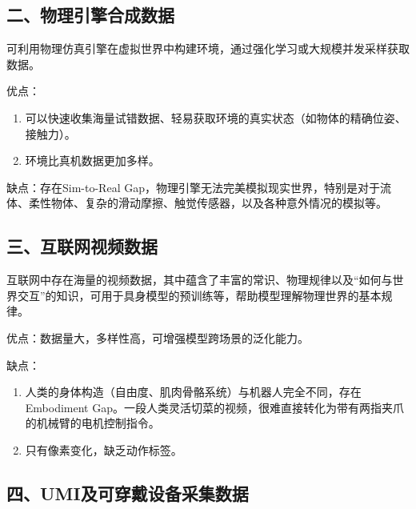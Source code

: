 \hypertarget{ux4e8cux7269ux7406ux5f15ux64ceux5408ux6210ux6570ux636e}{%
\subsection{二、物理引擎合成数据}\label{ux4e8cux7269ux7406ux5f15ux64ceux5408ux6210ux6570ux636e}}

可利用物理仿真引擎在虚拟世界中构建环境，通过强化学习或大规模并发采样获取数据。

优点：

\begin{enumerate}
\def\labelenumi{\arabic{enumi}.}
\item
  可以快速收集海量试错数据、轻易获取环境的真实状态（如物体的精确位姿、接触力）。
\item
  环境比真机数据更加多样。
\end{enumerate}

缺点：存在Sim-to-Real Gap，物理引擎无法完美模拟现实世界，特别是对于流体、柔性物体、复杂的滑动摩擦、触觉传感器，以及各种意外情况的模拟等。

\hypertarget{ux4e09ux4e92ux8054ux7f51ux89c6ux9891ux6570ux636e}{%
\subsection{三、互联网视频数据}\label{ux4e09ux4e92ux8054ux7f51ux89c6ux9891ux6570ux636e}}

互联网中存在海量的视频数据，其中蕴含了丰富的常识、物理规律以及``如何与世界交互''的知识，可用于具身模型的预训练等，帮助模型理解物理世界的基本规律。

优点：数据量大，多样性高，可增强模型跨场景的泛化能力。

缺点：

\begin{enumerate}
\def\labelenumi{\arabic{enumi}.}
\item
  人类的身体构造（自由度、肌肉骨骼系统）与机器人完全不同，存在Embodiment Gap。一段人类灵活切菜的视频，很难直接转化为带有两指夹爪的机械臂的电机控制指令。
\item
  只有像素变化，缺乏动作标签。
\end{enumerate}

\hypertarget{ux56dbumiux53caux53efux7a7fux6234ux8bbeux5907ux91c7ux96c6ux6570ux636e}{%
\subsection{四、UMI及可穿戴设备采集数据}\label{ux56dbumiux53caux53efux7a7fux6234ux8bbeux5907ux91c7ux96c6ux6570ux636e}}

